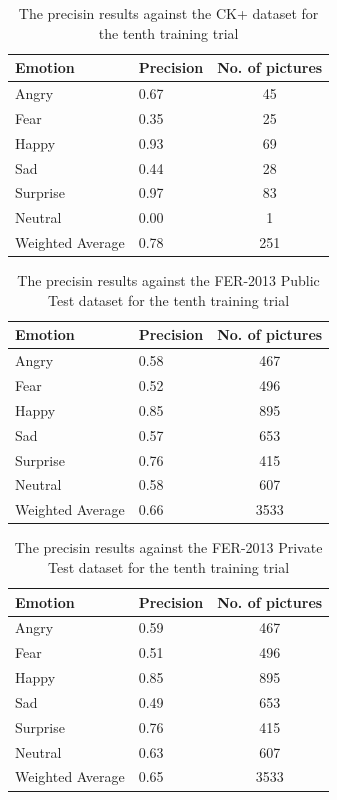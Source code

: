\documentclass[runningheads,a4paper,11pt]{report}
\begin{document}
\begin{table}[htbp]
	\caption{The precisin results against the CK+ dataset for the tenth training trial}
	\label{fer_training_28k_01_mean_square_filtered_augmented_x6_ckp}
		\begin{center}
			\begin{tabular}{p{110pt}p{110pt}c}
				\textbf{Emotion}& \textbf{Precision}& \textbf{No. of pictures} \\
				\hline\hline
				Angry& 0.67& 45 \\
				Fear& 0.35& 25 \\
				Happy& 0.93& 69 \\
				Sad& 0.44& 28 \\
				Surprise& 0.97& 83 \\
				Neutral& 0.00& 1 \\
				\hline
				Weighted Average& 0.78& 251
			\end{tabular}
		\end{center}
\end{table}
\begin{table}[htbp]
	\caption{The precisin results against the FER-2013 Public Test dataset for the tenth training trial}
	\label{fer_training_28k_01_mean_square_filtered_augmented_x6_public_test}
		\begin{center}
			\begin{tabular}{p{110pt}p{110pt}c}
				\textbf{Emotion}& \textbf{Precision}& \textbf{No. of pictures} \\
				\hline\hline
				Angry& 0.58& 467 \\
				Fear& 0.52& 496 \\
				Happy& 0.85& 895 \\
				Sad& 0.57& 653 \\
				Surprise& 0.76& 415 \\
				Neutral& 0.58& 607 \\
				\hline
				Weighted Average& 0.66 &3533
			\end{tabular}
		\end{center}
\end{table}
\begin{table}[htbp]
	\caption{The precisin results against the FER-2013 Private Test dataset for the tenth training trial}
	\label{fer_training_28k_01_mean_square_filtered_augmented_x6_private_test}
		\begin{center}
			\begin{tabular}{p{110pt}p{110pt}c}
				\textbf{Emotion}& \textbf{Precision}& \textbf{No. of pictures} \\
				\hline\hline
				Angry& 0.59& 467 \\
				Fear& 0.51& 496 \\
				Happy& 0.85& 895 \\
				Sad& 0.49& 653 \\
				Surprise& 0.76& 415 \\
				Neutral& 0.63& 607 \\
				\hline
				Weighted Average& 0.65 &3533
			\end{tabular}
		\end{center}
\end{table}
\end{document}
